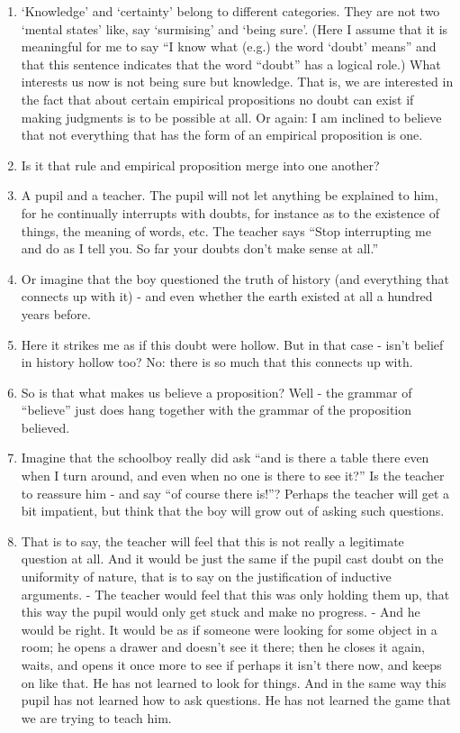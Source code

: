 \documentclass{book}
\begin{document}
\begin{enumerate}
\item
`Knowledge' and `certainty' belong to different categories. They are not two
`mental states' like, say `surmising' and `being sure'. (Here I assume that it
is meaningful for me to say ``I know what (e.g.) the word `doubt' means'' and
that this sentence indicates that the word ``doubt'' has a logical role.) What
interests us now is not being sure but knowledge. That is, we are interested in
the fact that about certain empirical propositions no doubt can exist if making
judgments is to be possible at all. Or again: I am inclined to believe that not
everything that has the form of an empirical proposition is one.

\item
Is it that rule and empirical proposition merge into one another?

\item
A pupil and a teacher. The pupil will not let anything be explained to him, for
he continually interrupts with doubts, for instance as to the existence of
things, the meaning of words, etc. The teacher says ``Stop interrupting me and
do as I tell you. So far your doubts don't make sense at all.''

\item
Or imagine that the boy questioned the truth of history (and everything that
connects up with it) - and even whether the earth existed at all a hundred
years before.

\item
Here it strikes me as if this doubt were hollow. But in that case - isn't
belief in history hollow too? No: there is so much that this connects up with.

\item
So is that what makes us believe a proposition? Well - the grammar of
``believe'' just does hang together with the grammar of the proposition
believed.

\item
Imagine that the schoolboy really did ask ``and is there a table there even
when I turn around, and even when no one is there to see it?'' Is the teacher
to reassure him - and say ``of course there is!''?  Perhaps the teacher will
get a bit impatient, but think that the boy will grow out of asking such
questions.

\item
That is to say, the teacher will feel that this is not really a legitimate
question at all.  And it would be just the same if the pupil cast doubt on the
uniformity of nature, that is to say on the justification of inductive
arguments. - The teacher would feel that this was only holding them up, that
this way the pupil would only get stuck and make no progress. - And he would be
right. It would be as if someone were looking for some object in a room; he
opens a drawer and doesn't see it there; then he closes it again, waits, and
opens it once more to see if perhaps it isn't there now, and keeps on like
that. He has not learned to look for things. And in the same way this pupil has
not learned how to ask questions. He has not learned the game that we are
trying to teach him.


\end{enumerate}
\end{document}

